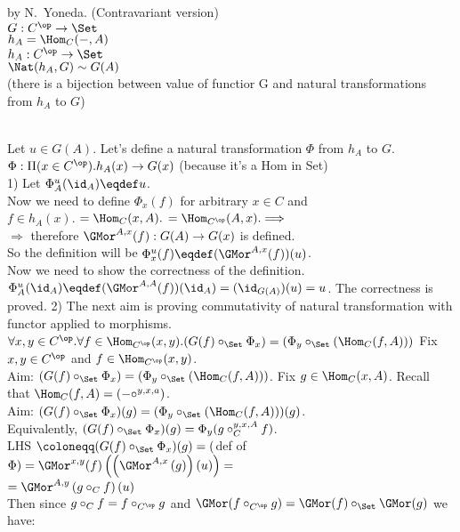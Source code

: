 \documentclass[10pt,a4paper]{article}
\begin{document}
\myqed
\begin{lemma}{by N.~Yoneda. (Contravariant version)}\\
$G : C^\op \to \Set$\\
$h_A = \Hom_C(-,A)$\\
$h_A : C^\op \to \Set$\\
$\Nat(h_A,G)\sim G(A)$\\
(there is a bijection between value of functior G and natural transformations from $h_A$ to $G$)
\end{lemma}
\myprf\\
Let $u\in G(A)$. Let's define a natural transformation $\Phi$ from $h_A$ to $G$.\\
$\Phi:\Pi(x\in C^\op).h_A(x)\to G(x)$ (because it's a Hom in Set)\\
1) Let $\Phi^u_A(\id_A)\eqdef u$. \\
Now we need to define $\Phi_x(f)$ for arbitrary $x\in C$ and\\
$f\in h_A(x).$ $=\Hom_C(x,A).$ $=\Hom_{C^\op}(A,x). \Longrightarrow$\\
$\Longrightarrow$ therefore $\GMor ^{A,x}(f):G(A)\to G(x)$ is defined.\\
So the definition will be $\Phi^u_x(f)\eqdef (\GMor^{A,x}(f))(u)$.\\
Now we need to show the correctness of the definition.\\
$\Phi^u_A(\id_A)\eqdef (\GMor^{A,A}(f))(\id_A) = (\id_{G(A)})(u) = u$. The correctness is proved.
2) The next aim is proving commutativity of natural transformation with functor applied to morphisms.\\
$\forall x,y\in C^\op.\forall f\in \Hom_{C^\op}(x,y).(G(f)\circ_\Set \Phi_x) = (\Phi_y \circ_\Set (\Hom_C(f,A)))$
Fix  $x,y\in C^\op$ and $f\in \Hom_{C^\op}(x,y)$.\\
Aim: $(G(f)\circ_\Set \Phi_x) = (\Phi_y \circ_\Set (\Hom_C(f,A)))$.
Fix $g\in \Hom_C(x,A)$. Recall that $\Hom_C(f,A)=(-\circ^{y,x,a})$.\\
Aim: $(G(f)\circ_\Set \Phi_x)(g) = (\Phi_y \circ_\Set (\Hom_C(f,A)))(g)$.\\
Equivalently, $(G(f)\circ_\Set \Phi_x)(g) = \Phi_y (g\circ_C^{y,x,A} f)$.\\
LHS $\coloneqq (G(f)\circ_\Set \Phi_x)(g) =($def of $\Phi)= \GMor^{x,y}(f)\left(\left(\GMor^{A,x}\left(g\right)\right)\left(u\right)\right) =$\\
$ =\GMor^{A,y}\left(g\circ_C f\right)(u)$\\
Then since $g\circ_C f = f\circ_{C^\op} g$ and $\GMor(f\circ_{C^\op} g)=  \GMor(f)\circ_\Set \GMor(g)$ we have:\\
\end{document}
